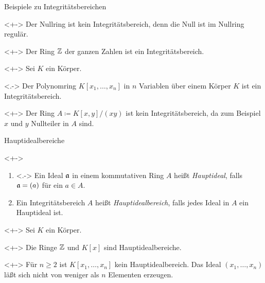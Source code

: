 \begin{frame}{Beispiele zu Integritätsbereichen}
    \begin{example}<+->
        Der Nullring ist kein Integritätsbereich, denn die Null ist im Nullring 
        regulär.  
    \end{example}
    \begin{example}<+->
        Der Ring \(\mathbb Z\) der ganzen Zahlen ist ein Integritätsbereich.
    \end{example}
    \begin{visibleenv}<+->
        Sei \(K\) ein Körper.
    \end{visibleenv}
    \begin{example}<.->
        Der Polynomring \(K[x_1, \dotsc, x_n]\) in \(n\) Variablen über einem Körper
        \(K\) ist ein Integritätsbereich.
    \end{example}
    \begin{example}<+->
        Der Ring \(A \coloneqq K[x, y]/(x y)\) ist kein Integritätsbereich, da zum
        Beispiel \(x\) und \(y\) Nullteiler in \(A\) sind.
    \end{example}
\end{frame}

\begin{frame}{Hauptidealbereiche}
    \begin{definition}<+->
        \begin{enumerate}[<+->]
        \item<.->
            Ein Ideal \(\mathfrak{a}\) in einem kommutativen Ring \(A\) heißt
            \emph{Hauptideal}, falls \(\mathfrak{a} = (a)\) für ein \(a \in A\).
        \item
            Ein Integritätsbereich \(A\) heißt \emph{Hauptidealbereich}, falls 
            jedes Ideal in \(A\) ein Hauptideal ist.
        \end{enumerate}
    \end{definition}
    \begin{visibleenv}<+->
        Sei \(K\) ein Körper.
    \end{visibleenv}
    \begin{example}<+->
        Die Ringe \(\mathbb Z\) und \(K[x]\) sind Hauptidealbereiche.
    \end{example}
    \begin{remark}<+->
        Für \(n \ge 2\) ist \(K[x_1, \dotsc, x_n]\) kein
        Hauptidealbereich. Das Ideal \((x_1, \dotsc, x_n)\)
        läßt sich nicht von weniger als \(n\) Elementen erzeugen.
    \end{remark}
\end{frame}

